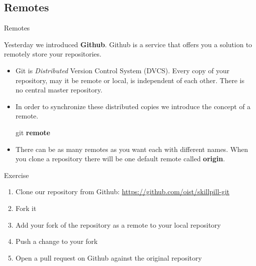 \documentclass{beamer}
\begin{document}
\subsection{Remotes}
\begin{frame}[fragile]{Remotes}

Yesterday we introduced \textbf{Github}. Github is a service that offers you a solution to remotely store your repositories. 
\begin{itemize}
    \item Git is \emph{Distributed} Version Control System (DVCS). Every copy of your repository, may it be remote or local, is independent of each other. There is no central master repository. 

    \item In order to synchronize these distributed copies we introduce the concept of a remote.
\pause
  \begin{block}{}
    git \textbf{remote}
  \end{block}
\pause
  \item There can be as many remotes as you want each with different names. When you clone a repository there will be one default remote called \textbf{origin}.
\end{itemize}
\end{frame}
\begin{frame}
  \begin{block}{Exercise}
    \begin{enumerate}
      \item Clone our repository from Github: \url{https://github.com/oist/skillpill-git}
      \item Fork it
      \item Add your fork of the repository as a remote to your local repository
      \item Push a change to your fork
      \item Open a pull request on Github against the original repository
    \end{enumerate}
  \end{block}
\end{frame}
\end{document}
